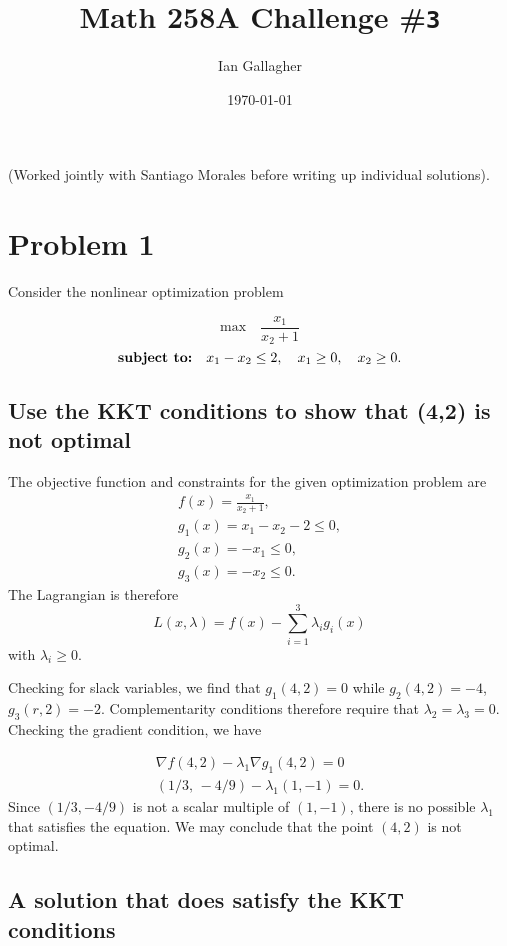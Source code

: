 \documentclass[11pt]{article}
\title{Math 258A Challenge \#\texttt{3}}
\author{Ian Gallagher}
\date{\today}
\theoremstyle{problemstyle}
\begin{document}
\maketitle

\noindent (Worked jointly with Santiago Morales before writing up individual
solutions).

\section*{Problem 1}
Consider the nonlinear optimization problem

\[
\text{max} \quad \frac{x_1}{x_2 + 1}
\]
\[
\text{\bf subject to:} \quad x_1 - x_2 \leq 2, \quad x_1 \geq 0, \quad x_2 \geq 0.
\]

\subsection*{Use the KKT conditions to show that (4,2) is not optimal}

The objective function and constraints for the given optimization problem are
\begin{align*}
  f(x) = \frac{x_1}{x_2+1}, \\
  g_1(x)=x_1-x_2-2\le0, \\
  g_2(x)=-x_1\le0, \\
  g_3(x)=-x_2\le0 .
\end{align*}
The Lagrangian is therefore
\[
  L(x,\lambda)=f(x)-\sum_{i=1}^3\lambda_i g_i(x)
\]
with $\lambda_i\ge0$.

Checking for slack variables, we find that $g_1(4,2)=0$ while $g_2(4,2)=-4$,
$g_3(r,2)=-2$. Complementarity conditions therefore require that $\lambda_2 =
\lambda_3 = 0$. Checking the gradient condition, we have

\begin{align*}
\nabla f(4,2)-\lambda_1\nabla g_1(4,2)=0 \\
(1/3,\,-4/9)-\lambda_1(1,-1)=0.
\end{align*}
Since $(1/3, -4/9)$ is not a scalar multiple of $(1,-1)$, there is no possible
$\lambda_1$ that satisfies the equation. We may conclude that the point $(4,2)$
is not optimal.

\subsection*{A solution that does satisfy the KKT conditions}
\end{document}
